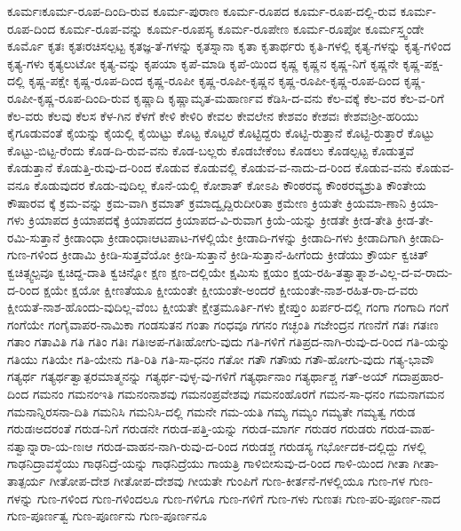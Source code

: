 {ಕೂರ್ಮಃಕೂರ್ಮ-ರೂಪ-ದಿಂದಿ-ರುವ
ಕೂರ್ಮ-ಪುರಾಣ
ಕೂರ್ಮ-ರೂಪದ
ಕೂರ್ಮ-ರೂಪ-ದಲ್ಲಿ-ರುವ
ಕೂರ್ಮ-ರೂಪ-ದಿಂದ
ಕೂರ್ಮ-ರೂಪ-ವನ್ನು
ಕೂರ್ಮ-ರೂಪಸ್ಯ
ಕೂರ್ಮ-ರೂಪೇಣ
ಕೂರ್ಮ-ರೂಪೋ
ಕೂರ್ಮಸ್ತ್ವಂಡೇ
ಕೂರ್ಮೊ
ಕೃತಃ
ಕೃತಃರಚಿಸಲ್ಪಟ್ಟ
ಕೃತಜ್ಞ-ತೆ-ಗಳನ್ನು
ಕೃತಸ್ನಾನಾ
ಕೃತಾ
ಕೃತಾರ್ಥರು
ಕೃತಿ-ಗಳಲ್ಲಿ
ಕೃತ್ಯ-ಗಳನ್ನು
ಕೃತ್ಯ-ಗಳಿಂದ
ಕೃತ್ಯ-ಗಳು
ಕೃತ್ಯಲುಟೋ
ಕೃತ್ಯ-ವನ್ನು
ಕೃಪಯಾ
ಕೃಪೆ-ಮಾಡಿ
ಕೃಪೆ-ಯಿಂದ
ಕೃಷ್ಣ
ಕೃಷ್ಣನ
ಕೃಷ್ಣ-ನಿಗೆ
ಕೃಷ್ಣನೇ
ಕೃಷ್ಣ-ಪಕ್ಷ-ದಲ್ಲಿ
ಕೃಷ್ಣ-ಪಕ್ಷೇ
ಕೃಷ್ಣ-ರೂಪ-ದಿಂದ
ಕೃಷ್ಣ-ರೂಪೀ
ಕೃಷ್ಣ-ರೂಪೀ-ಕೃಷ್ಣನ
ಕೃಷ್ಣ-ರೂಪೀ-ಕೃಷ್ಣ-ರೂಪ-ದಿಂದ
ಕೃಷ್ಣ-ರೂಪೀ-ಕೃಷ್ಣ-ರೂಪ-ದಿಂದಿ-ರುವ
ಕೃಷ್ಣಾದಿ
ಕೃಷ್ಣಾಮೃತ-ಮಹಾರ್ಣವ
ಕೆಡಿಸಿ-ದ-ವನು
ಕೆಲ-ವಕ್ಕೆ
ಕೆಲ-ವರ
ಕೆಲ-ವ-ರಿಗೆ
ಕೆಲ-ವರು
ಕೆಲವು
ಕೆಲಸ
ಕೆಳ-ಗಿನ
ಕೆಳಗೆ
ಕೇಳಿ
ಕೇಳಿರಿ
ಕೇವಲ
ಕೇವಲೇನ
ಕೇಶವಂ
ಕೇಶವಃ
ಕೇಶವಃಶ್ರೀ-ಹರಿಯು
ಕೈಗೂಡುವಂತೆ
ಕೈಯನ್ನು
ಕೈಯಲ್ಲಿ
ಕೈಯಿಟ್ಟು
ಕೊಟ್ಟ
ಕೊಟ್ಟರೆ
ಕೊಟ್ಟಿದ್ದರು
ಕೊಟ್ಟಿ-ರುತ್ತಾನೆ
ಕೊಟ್ಟಿ-ರುತ್ತಾರೆ
ಕೊಟ್ಟು
ಕೊಟ್ಟು-ಬಿಟ್ಟ-ರೆಂದು
ಕೊಡ-ದಿ-ರುವ-ವನು
ಕೊಡ-ಬಲ್ಲರು
ಕೊಡಬೇಕೆಂಬ
ಕೊಡಲು
ಕೊಡಲ್ಪಟ್ಟ
ಕೊಡುತ್ತವೆ
ಕೊಡುತ್ತಾನೆ
ಕೊಡುತ್ತಿ-ರುವು-ದ-ರಿಂದ
ಕೊಡುವ
ಕೊಡುವಲ್ಲಿ
ಕೊಡುವ-ವ-ನಾದು-ದ-ರಿಂದ
ಕೊಡುವ-ವನು
ಕೊಡುವ-ವನೂ
ಕೊಡುವುದರ
ಕೊಡು-ವುದಿಲ್ಲ
ಕೊನೆ-ಯಲ್ಲಿ
ಕೋಶಾತ್
ಕೋಽಪಿ
ಕೌಂಠರವ್ಯ
ಕೌಂಠರವ್ಯಶ್ರುತಿ
ಕೌಂತೇಯ
ಕೌಷಾರವ
ಕ್ಕೆ
ಕ್ರಮ-ವನ್ನು
ಕ್ರಮ-ವಾಗಿ
ಕ್ರಮಾತ್
ಕ್ರಮಾದ್ವೃದ್ದಿರುದೀರಿತಾ
ಕ್ರಮೇಣ
ಕ್ರಿಯತೇ
ಕ್ರಿಯಮಾ-ಣಾನಿ
ಕ್ರಿಯಾ-ಗಳು
ಕ್ರಿಯಾಪದ
ಕ್ರಿಯಾಪದಕ್ಕೆ
ಕ್ರಿಯಾಪದದ
ಕ್ರಿಯಾಪದ-ವಿ-ರುವಾಗ
ಕ್ರಿಯೆ-ಯನ್ನು
ಕ್ರೀಡತೇ
ಕ್ರೀಡ-ತೇತಿ
ಕ್ರೀಡ-ತೇ-ರಮಿ-ಸುತ್ತಾನೆ
ಕ್ರೀಡಾಂಧಾ
ಕ್ರೀಡಾಂಧಾಃಆಟಪಾಟ-ಗಳಲ್ಲಿಯೇ
ಕ್ರೀಡಾದಿ-ಗಳನ್ನು
ಕ್ರೀಡಾದಿ-ಗಳು
ಕ್ರೀಡಾದಿಗಾಗಿ
ಕ್ರೀಡಾದಿ-ಗುಣ-ಗಳಿಂದ
ಕ್ರೀಡಾಮಿ
ಕ್ರೀಡಿ-ಸುತ್ತವೆಯೋ
ಕ್ರೀಡಿ-ಸುತ್ತಾನೆ
ಕ್ರೀಡಿ-ಸುತ್ತಾನೆ-ಹೀಗೆಂದು
ಕ್ರೀಡೆಯು
ಕ್ರೌರ್ಯ
ಕ್ವಚಿತ್
ಕ್ವಚಿತ್ಸ್ವಲ್ಪವೂ
ಕ್ವಚಿದ್ದ-ದಾತಿ
ಕ್ವಚಿನ್ನೋ
ಕ್ಷಣ
ಕ್ಷಣ-ದಲ್ಲಿಯೇ
ಕ್ಷಮಿಸು
ಕ್ಷಯಂ
ಕ್ಷಯ-ರಹಿ-ತತ್ವಾತ್ನಾಶ-ವಿಲ್ಲ-ದ-ವ-ರಾದು-ದ-ರಿಂದ
ಕ್ಷಯೇ
ಕ್ಷಯೋ
ಕ್ಷೀಣತೆಯೂ
ಕ್ಷೀಯಂತೇ
ಕ್ಷೀಯಂತೇ-ಅಂದರೆ
ಕ್ಷೀಯಂತೇ-ನಾಶ-ರಹಿತ-ರಾ-ದ-ವರು
ಕ್ಷೀಯತೆ-ನಾಶ-ಹೊಂದು-ವುದಿಲ್ಲ-ವೆಂಬ
ಕ್ಷೀಯತೇ
ಕ್ಷೇತ್ರಮೂರ್ತಿ-ಗಳು
ಕ್ಷೇಪ್ತುಂ
ಖರ್ಪರ-ದಲ್ಲಿ
ಗಂಗಾ
ಗಂಗಾದಿ
ಗಂಗೆ
ಗಂಗೆಯೇ
ಗಂಗೈವಾಪರ-ನಾಮಿಕಾ
ಗಂಡಸುತನ
ಗಂತಾ
ಗಂಧವೂ
ಗಗನಂ
ಗಚ್ಛಂತಿ
ಗಜೇಂದ್ರನ
ಗಣನೆಗೆ
ಗತಃ
ಗತಃಣ
ಗತಾಂ
ಗತಾವಿತಿ
ಗತಿ
ಗತಿಂ
ಗತಿಃ
ಗತಿಃಅಪ-ಗತಿಃಹೋಗು-ವುದು
ಗತಿ-ಗಳಿಗೆ
ಗತಿಪ್ರದ-ನಾಗಿ-ರುವು-ದ-ರಿಂದ
ಗತಿ-ಯನ್ನು
ಗತಿಯು
ಗತಿಯೇ
ಗತಿ-ಯೇನು
ಗತಿ-ರಿತಿ
ಗತಿ-ಸಾ-ಧನಂ
ಗತೋ
ಗತೌ
ಗತೌಋ
ಗತೌ-ಹೋಗು-ವುದು
ಗತ್ಯ-ಭಾವೌ
ಗತ್ಯರ್ಥ
ಗತ್ಯರ್ಥತ್ವಾತ್ಪರಮಾತ್ಮನನ್ನು
ಗತ್ಯರ್ಥ-ವುಳ್ಳ-ವು-ಗಳಿಗೆ
ಗತ್ಯರ್ಥಾನಾಂ
ಗತ್ಯರ್ಥಾಶ್ಚ
ಗತ್-ಅಯ್
ಗದಾಪ್ರಹಾರ-ದಿಂದ
ಗಮನಂ
ಗಮನಂಇತಿ
ಗಮನಂನಾಶವು
ಗಮನಂಪ್ರವೇಶವು
ಗಮನಂಹೊರಗೆ
ಗಮನ-ಸಾ-ಧನಂ
ಗಮನಾಗಮನ
ಗಮನಾನ್ನಿರಸನಾ-ದಿತಿ
ಗಮನಿಸಿ
ಗಮನಿಸಿ-ದಲ್ಲಿ
ಗಮನೇ
ಗಮ-ಯತಿ
ಗಮ್ಯ
ಗಮ್ಯಂ
ಗಮ್ಯತೇ
ಗಮ್ಯತ್ವ
ಗರುಡ
ಗರುಡಃಅದರಂತೆ
ಗರುಡ-ನಿಗೆ
ಗರುಡನೇ
ಗರುಡ-ಪತ್ತಿ-ಯನ್ನು
ಗರುಡ-ಮಾರ್ಗ
ಗರುಡರ
ಗರುಡರು
ಗರುಡ-ವಾಹ-ನತ್ವಾನ್ನಾರಾ-ಯ-ಣಃಆ
ಗರುಡ-ವಾಹನ-ನಾಗಿ-ರುವು-ದ-ರಿಂದ
ಗರುಡಶ್ಚ
ಗರುಡಸ್ಯ
ಗರ್ಭೋದಕ-ದಲ್ಲಿದ್ದು
ಗಳಲ್ಲಿ
ಗಾಢನಿದ್ರಾವಸ್ಥೆಯು
ಗಾಢನಿದ್ರೆ-ಯನ್ನು
ಗಾಢನಿದ್ರೆಯು
ಗಾಯತ್ರಿ
ಗಾಳಿಬೀಸುವು-ದ-ರಿಂದ
ಗಾಳಿ-ಯಿಂದ
ಗೀತಾ
ಗೀತಾ-ತಾತ್ಪರ್ಯ
ಗೀತೋಪ-ದೇಶ
ಗೀತೋಪ-ದೇಶವು
ಗೀಯತೇ
ಗುಂಪಿಗೆ
ಗುಣ-ಕೀರ್ತನೆ-ಗಳಲ್ಲಿಯೂ
ಗುಣ-ಗಳ
ಗುಣ-ಗಳನ್ನು
ಗುಣ-ಗಳಿಂದ
ಗುಣ-ಗಳಿಂದಲೂ
ಗುಣ-ಗಳಿಗೂ
ಗುಣ-ಗಳಿಗೆ
ಗುಣ-ಗಳು
ಗುಣತಃ
ಗುಣ-ಪರಿ-ಪೂರ್ಣ-ನಾದ
ಗುಣ-ಪೂರ್ಣತ್ವ
ಗುಣ-ಪೂರ್ಣನು
ಗುಣ-ಪೂರ್ಣನೂ
}
